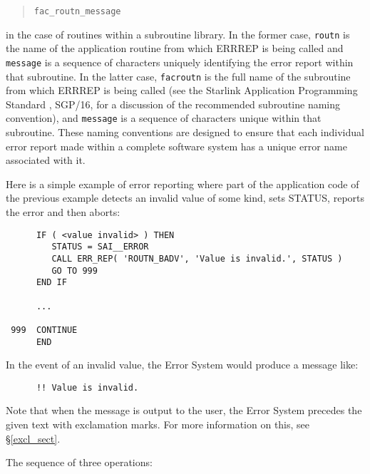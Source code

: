 \documentclass[twoside,11pt]{article}
\newcommand{\htmlref}[2]{#1}
\newcommand{\latex}[1]{#1}
\newcommand{\xref}[3]{#1}
\renewcommand{\_}{\texttt{\symbol{95}}}
\begin{document}
\begin {quote}
\begin {small}
\begin{verbatim}
fac_routn_message
\end{verbatim}
\end {small}
\end {quote}

in the case of routines within a subroutine library.
In the former case, \texttt{routn} is the name of the application routine from
which ERR\_REP is being called and \texttt{message} is a sequence of characters
uniquely identifying the error report within that subroutine. 
In the latter case, \texttt{fac\_routn} is the full name of the subroutine from
which ERR\_REP is being called (see the 
\xref{Starlink Application Programming Standard}{sgp16}{}
\latex{, SGP/16,} for a discussion of the recommended subroutine naming
convention), and \texttt{message} is a sequence of characters unique within 
that subroutine.
These naming conventions are designed to ensure that each individual error
report made within a complete software system has a unique error name
associated with it. 

Here is a simple example of error reporting where part of the application
code of the previous example detects an invalid value of some kind, sets
STATUS, reports the error and then aborts: 

\begin {small}
\begin{verbatim}
      IF ( <value invalid> ) THEN
         STATUS = SAI__ERROR
         CALL ERR_REP( 'ROUTN_BADV', 'Value is invalid.', STATUS )
         GO TO 999
      END IF

      ...

 999  CONTINUE
      END
\end{verbatim}
\end {small}

In the event of an invalid value, the Error System would produce a message 
like:
\begin{small}
\begin{verbatim}
      !! Value is invalid.
\end{verbatim}
\end{small}
Note that when the message is output to the user, the Error System precedes 
the given text with 
\htmlref{exclamation marks}{excl_sect}.
\latex{For more information on this, see \S\ref{excl_sect}.}

The sequence of three operations:
\end{document}
